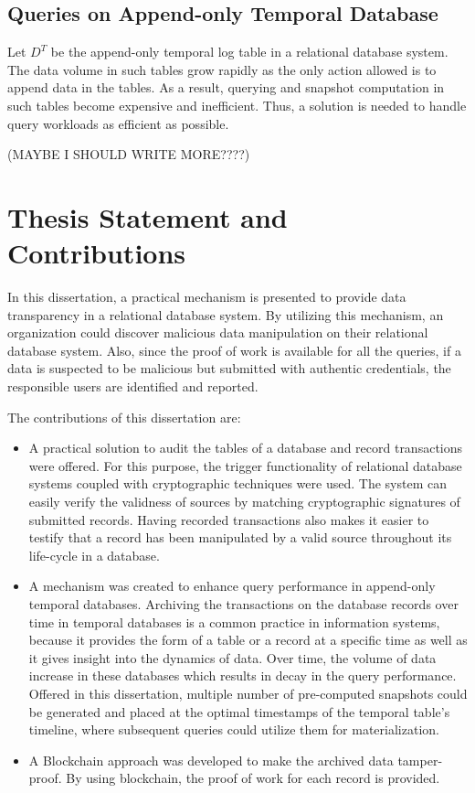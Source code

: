 \subsection{Queries on Append-only Temporal Database}
Let $D^T$ be the append-only temporal log table in a relational database system. The data volume in such tables grow rapidly as the only action allowed is to append data in the tables. As a result, querying and snapshot computation in such tables become expensive and inefficient. Thus, a solution is needed to handle query workloads as efficient as possible.
\begin{info} \color{red} (MAYBE I SHOULD WRITE MORE????) \end{info}
\section{Thesis Statement and Contributions}
In this dissertation, a practical mechanism is presented to provide data transparency in a relational database system. By utilizing this mechanism, an organization could discover malicious data manipulation on their relational database system. Also, since the proof of work is available for all the queries, if a data is suspected to be malicious but submitted with authentic credentials, the responsible users are identified and reported.

The contributions of this dissertation are:
\begin{itemize}
	\item A practical solution to audit the tables of a database and record transactions were offered. For this purpose, the trigger functionality of relational database systems coupled with cryptographic techniques were used. The system can easily verify the validness of sources by matching cryptographic signatures of submitted records. Having recorded transactions also makes it easier to testify that a record has been manipulated by a valid source throughout its life-cycle in a database. 
	
	\item A mechanism was created to enhance query performance in append-only temporal databases. Archiving the transactions on the database records over time in temporal databases is a common practice in information systems, because it provides the form of a table or a record at a specific time as well as it gives insight into the dynamics of data. Over time, the volume of data increase in these databases which results in decay in the query performance. Offered in this dissertation, multiple number of pre-computed snapshots could be generated and placed at the optimal timestamps of the temporal table's timeline, where subsequent queries could utilize them for materialization.
	
	\item A Blockchain approach was developed to make the archived data tamper-proof. By using blockchain, the proof of work for each record is provided.
\end{itemize}
